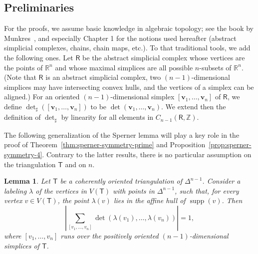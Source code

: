 \documentclass[12pt]{amsart}
\newtheorem{lemma}{Lemma}
\theoremstyle{definition}
\theoremstyle{remark}
\def\R{\mathbb{R}}
\def\Rsf{\mathsf{R}}
\def\Z{\mathbb{Z}}
\def\T{\mathsf{T}}
\def\vv{\boldsymbol{v}}
\def\supp{\operatorname{supp}}
\def\det{\operatorname{det}}
\def\supp{\operatorname{supp}}
\begin{document}
\subsection{Preliminaries}

For the proofs, we assume basic knowledge in algebraic topology; see the book by Munkres~\cite{Mun}, and especially Chapter 1 for the notions used hereafter (abstract simplicial complexes, chains, chain maps, etc.). To that traditional tools, we add the following ones. Let $\Rsf$ be the abstract simplicial complex whose vertices are the points of $\R^n$ and whose maximal simplices are all possible $n$-subsets of $\R^n$. (Note that $\Rsf$ is an abstract simplicial complex, two $(n-1)$-dimensional simplices may have intersecting convex hulls, and the vertices of a simplex can be aligned.) For an oriented $(n-1)$-dimensional simplex $[\vv_1,\ldots,\vv_n]$ of $\Rsf$, we define $\det_{\sharp}([\vv_1,\ldots,\vv_n])$ to be $\det(\vv_1,\ldots,\vv_n)$. We extend then the definition of $\det_{\sharp}$ by linearity for all elements in $C_{n-1}(\Rsf,\Z)$.

The following generalization of the Sperner lemma will play a key role in the proof of Theorem~\ref{thm:sperner-symmetry-prime} and Proposition~\ref{prop:sperner-symmetry-4}. Contrary to the latter results, there is no particular assumption on the triangulation $\T$ and on $n$.

\begin{lemma}\label{lem:sperner_det}
Let $\T$ be a coherently oriented triangulation of $\Delta^{n-1}$. Consider a labeling $\lambda$ of the vertices in $V(\T)$ with points in $\Delta^{n-1}$, such that, for every vertex $v\in V(\T)$, the point $\lambda(v)$ lies in the affine hull of $\supp(v)$.
Then $$\left|\sum_{[v_1,\ldots,v_n]}\det(\lambda(v_1),\ldots,\lambda(v_n))\right|=1,$$ where $[v_1,\ldots,v_n]$ runs over the positively oriented $(n-1)$-dimensional simplices of $\T$.
\end{lemma}
\end{document}

